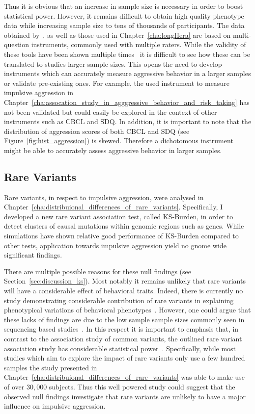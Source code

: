 Thus it is obvious that an increase in sample size is necessary in order to boost statistical power.
However, it remains difficult to obtain high quality phenotype data while increasing sample size to tens of thousands of participants.
The data obtained by~\citet{Pappa2016a}, as well as those used in Chapter~\ref{cha:longHera} are based on multi-question instruments, commonly used with multiple raters.
While the validity of these tools have been shown multiple times~\cite{Goodman1997,Goodman2001,Achenbach2003} it is difficult to see how these can be translated to studies larger sample sizes.
This opens the need to develop instruments which can accurately measure aggressive behavior in a larger samples or validate pre-existing ones.  
For example, the used instrument to measure impulsive aggression in Chapter~\ref{cha:assocation_study_in_agggressive_behavior_and_risk_taking} has not been validated but could easily be explored in the context of other instruments such as CBCL and SDQ\@.
In addition, it is important to note that the distribution of aggression scores of both CBCL and SDQ (see Figure~\ref{fig:hist_aggression}) is skewed.
Therefore a dichotomous instrument might be able to accurately assess aggressive behavior in larger samples. 

\subsection{Rare Variants}
\label{sub:rare_variants_disccusion}

Rare variants, in respect to impulsive aggression, were analysed in Chapter~\ref{cha:distribuional_differences_of_rare_variants}.
Specifically, I developed a new rare variant association test, called KS-Burden, in order to detect clusters of causal mutations within genomic regions such as genes.
While simulations have shown relative good performance of KS-Burden compared to other tests, application towards impulsive aggression yield no gnome wide significant findings. 

There are multiple possible reasons for these null findings (see Section~\ref{sec:discussion_ks}).
Most notably it remains unlikely that rare variants will have a considerable effect of behavioral traits.
Indeed, there is currently no study demonstrating considerable contribution of rare variants in explaining phenotypical variations of behavioral phenotypes~\cite{Chabris2015}.
However, one could argue that these lacks of findings are due to the low sample sample sizes commonly seen in sequencing based studies~\cite{Lee2014}. 
In this respect it is important to emphasis that, in contrast to the association study of common variants, the outlined rare variant association study has considerable statistical power~\cite{Lee2011}.
Specifically, while most studies which aim to explore the impact of rare variants only use a few hundred samples the study presented in Chapter~\ref{cha:distribuional_differences_of_rare_variants} was able to make use of over $30,000$ subjects. 
Thus this well powered study could suggest that the observed  null findings investigate that rare variants are unlikely to have a major influence on impulsive aggression.

